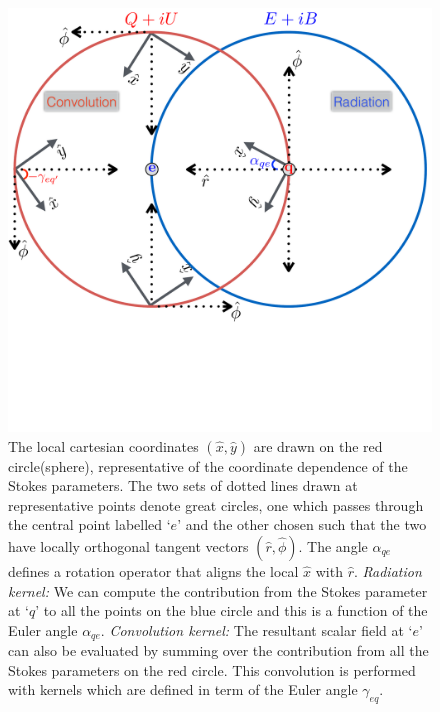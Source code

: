 \documentclass[a4paper,11pt]{article}
\begin{document}
%
\begin{figure}[!t]
\centering
\includegraphics[width=0.5\columnwidth]{radiation_convolution.pdf}
\caption{The local cartesian coordinates $(\hat{x},\hat{y})$ are drawn on the red circle(sphere), representative of the coordinate dependence of the Stokes parameters. The two sets of dotted lines drawn at representative points denote great circles, one which passes through the central point labelled `$e$' and the other chosen such that the two have locally orthogonal tangent vectors $(\hat{r},\hat{\phi})$. The angle $\alpha_{qe}$ defines a rotation operator that aligns the local $\hat{x}$ with $\hat{r}$.   \textit{Radiation kernel:} We can compute the contribution from the Stokes parameter at `$q$' to all the points on the blue circle and this is a function of the Euler angle $\alpha_{qe}$. \textit{Convolution kernel:} The resultant scalar field at `$e$' can also be evaluated by summing over the contribution from all the Stokes parameters on the red circle. This convolution is performed with kernels which are defined in term of the Euler angle $\gamma_{eq}$.}
\label{fig:planar_euler_angles}
\end{figure}
%
\end{document}
